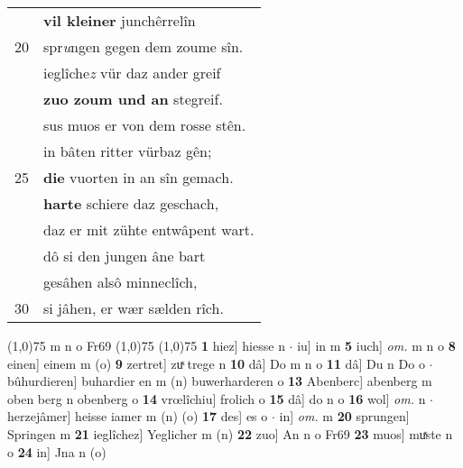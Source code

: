 \documentclass[8pt,a4paper,notitlepage]{article}
\begin{document}
\begin{table}[ht]
\begin{minipage}[t]{0.5\linewidth}
\begin{tabular}{rl}
 & \textbf{vil kleiner} junchêrrelîn\\ 
20 & spr\textit{u}ngen gegen dem zoume sîn.\\ 
 & ieglîche\textit{z} vür daz ander greif\\ 
 & \textbf{zuo zoum und an} stegreif.\\ 
 & sus muos er von dem rosse stên.\\ 
 & in bâten ritter vürbaz gên;\\ 
25 & \textbf{die} vuorten in an sîn gemach.\\ 
 & \textbf{harte} schiere daz geschach,\\ 
 & daz er mit zühte entwâpent wart.\\ 
 & dô si den jungen âne bart\\ 
 & gesâhen alsô minneclîch,\\ 
30 & si jâhen, er wær sælden rîch.\\ 
\end{tabular}
\scriptsize
\line(1,0){75} \newline
m n o Fr69 \newline
\line(1,0){75} \newline
\newline
\line(1,0){75} \newline
\textbf{1} hiez] hiesse n  $\cdot$ iu] in m \textbf{5} iuch] \textit{om.} m n o \textbf{8} einen] einem m (o) \textbf{9} zertret] zuͯ trege n \textbf{10} dâ] Do m n o \textbf{11} dâ] Du n Do o  $\cdot$ bûhurdieren] buhardier en m (n) buwerharderen o \textbf{13} Abenberc] abenberg m oben berg n obenberg o \textbf{14} vrœlîchiu] frolich o \textbf{15} dâ] do n o \textbf{16} wol] \textit{om.} n  $\cdot$ herzejâmer] heisse iamer m (n) (o) \textbf{17} des] es o  $\cdot$ in] \textit{om.} m \textbf{20} sprungen] Springen m \textbf{21} ieglîchez] Yeglicher m (n) \textbf{22} zuo] An n o Fr69 \textbf{23} muos] muͯste n o \textbf{24} in] Jna n (o) \newline
\end{minipage}
\end{table}
\newpage
\end{document}
